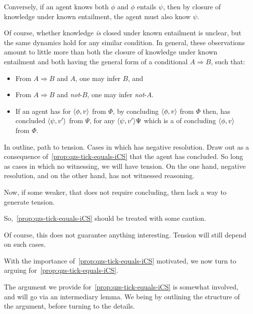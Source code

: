 \begin{note}[Contraposition]
{    Conversely, if an agent knows both \(\phi\) and \(\phi\) entails \(\psi\), then by closure of knowledge under known entailment, the agent must also know \(\psi\).

    Of course, whether knowledge \emph{is} closed under known entailment is unclear, but the same dynamics hold for any similar condition.
    In general, these observations amount to little more than both the closure of knowledge under known entailment and \iZS{} both having the general form of a conditional \(A \Rightarrow B\), such that:
    \begin{itemize}
    \item
      From \(A \Rightarrow B\) and \(A\), one may infer \(B\), and
    \item
      From \(A \Rightarrow B\) and \emph{not}-\(B\), one may infer \emph{not}-\(A\).
    \end{itemize}
  }

  \begin{itemize}
  \item
    If an agent has \ZS{} for \(\langle \phi, v \rangle\) from \(\Phi\), by concluding \(\langle \phi, v \rangle\) from \(\Phi\) then, has concluded \(\langle \psi, v' \rangle\) from \(\Psi\), for any \(\langle \psi, v' \rangle{\Psi}\) which is a \requ{} of concluding \(\langle \phi, v \rangle\) from \(\Phi\).
  \end{itemize}

  In outline, path to tension.
  Cases in which \qzS{} has negative resolution.
  Draw out as a consequence of~\autoref{prop:qzs-tick-equals-iCS} that the agent has concluded.
  So long as cases in which no witnessing, we will have tension.
  On the one hand, negative resolution, and on the other hand, has not witnessed reasoning.

  Now, if some weaker, that does not require concluding, then lack a way to generate tension.

  So,~\autoref{prop:qzs-tick-equals-iCS} should be treated with some caution.

  Of course, this does not guarantee anything interesting.
  Tension will still depend on such cases.
\end{note}

\begin{note}
  With the importance of~\autoref{prop:qzs-tick-equals-iCS} motivated, we now turn to arguing for~\autoref{prop:qzs-tick-equals-iCS}.

  The argument we provide for~\autoref{prop:qzs-tick-equals-iCS} is somewhat involved, and will go via an intermediary lemma.
  We being by outlining the structure of the argument, before turning to the details.
\end{note}

